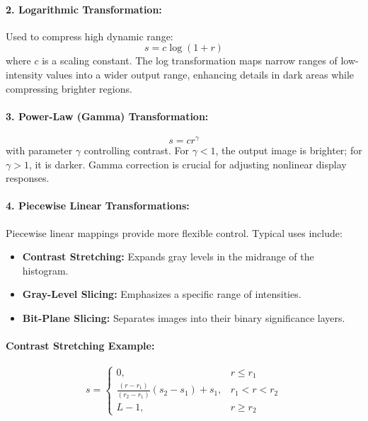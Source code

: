 \documentclass[12pt,a4paper]{AnantDocumentation}
\begin{document}
\paragraph{2. Logarithmic Transformation:} Used to compress high dynamic range:
\begin{equation}
s = c \log(1 + r)
\end{equation}
where $c$ is a scaling constant. The log transformation maps narrow ranges of low-intensity values into a wider output range, enhancing details in dark areas while compressing brighter regions.

\paragraph{3. Power-Law (Gamma) Transformation:}
\begin{equation}
s = c r^{\gamma}
\end{equation}
with parameter $\gamma$ controlling contrast. For $\gamma < 1$, the output image is brighter; for $\gamma > 1$, it is darker. Gamma correction is crucial for adjusting nonlinear display responses.

\paragraph{4. Piecewise Linear Transformations:}
Piecewise linear mappings provide more flexible control. Typical uses include:
\begin{itemize}
\item \textbf{Contrast Stretching:} Expands gray levels in the midrange of the histogram.
\item \textbf{Gray-Level Slicing:} Emphasizes a specific range of intensities.
\item \textbf{Bit-Plane Slicing:} Separates images into their binary significance layers.
\end{itemize}

\paragraph{Contrast Stretching Example:}
\begin{equation}
s = 
\begin{cases}
0, & r \le r_1 \\
\frac{(r - r_1)}{(r_2 - r_1)}(s_2 - s_1) + s_1, & r_1 < r < r_2 \\
L - 1, & r \ge r_2
\end{cases}
\end{equation}
\end{document}

